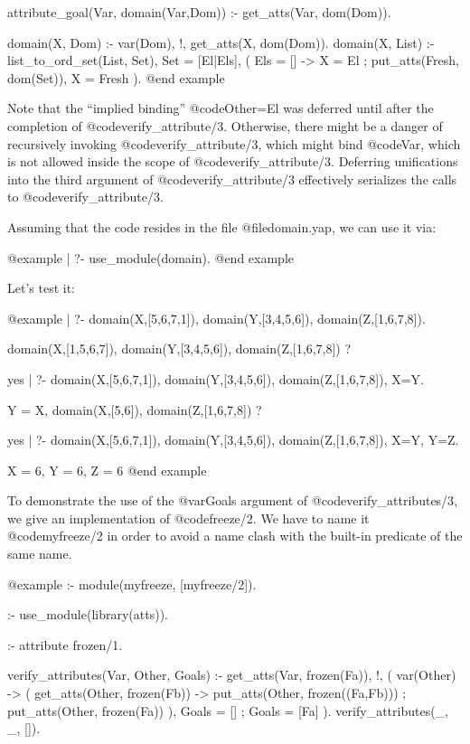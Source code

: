 attribute_goal(Var, domain(Var,Dom)) :-     %
        get_atts(Var, dom(Dom)).

domain(X, Dom) :-
        var(Dom), !,
        get_atts(X, dom(Dom)).
domain(X, List) :-
        list_to_ord_set(List, Set),
        Set = [El|Els],                     %
        (   Els = [] ->                     %
            X = El                          %
        ;   put_atts(Fresh, dom(Set)),
            X = Fresh                       %
        ).
@end example

Note that the ``implied binding'' @code{Other=El} was deferred until after
the completion of @code{verify_attribute/3}.  Otherwise, there might be a
danger of recursively invoking @code{verify_attribute/3}, which might bind
@code{Var}, which is not allowed inside the scope of @code{verify_attribute/3}.
Deferring unifications into the third argument of @code{verify_attribute/3}
effectively serializes the calls to @code{verify_attribute/3}.

Assuming that the code resides in the file @file{domain.yap}, we
can use it via:

@example
| ?- use_module(domain).
@end example

Let's test it:

@example
| ?- domain(X,[5,6,7,1]), domain(Y,[3,4,5,6]), domain(Z,[1,6,7,8]).

domain(X,[1,5,6,7]),
domain(Y,[3,4,5,6]),
domain(Z,[1,6,7,8]) ? 

yes
| ?- domain(X,[5,6,7,1]), domain(Y,[3,4,5,6]), domain(Z,[1,6,7,8]), 
     X=Y.

Y = X,
domain(X,[5,6]),
domain(Z,[1,6,7,8]) ? 

yes
| ?- domain(X,[5,6,7,1]), domain(Y,[3,4,5,6]), domain(Z,[1,6,7,8]),
     X=Y, Y=Z.

X = 6,
Y = 6,
Z = 6
@end example

To demonstrate the use of the @var{Goals} argument of
@code{verify_attributes/3}, we give an implementation of
@code{freeze/2}.  We have to name it @code{myfreeze/2} in order to
avoid a name clash with the built-in predicate of the same name.

@example
:- module(myfreeze, [myfreeze/2]).

:- use_module(library(atts)).

:- attribute frozen/1.

verify_attributes(Var, Other, Goals) :-
        get_atts(Var, frozen(Fa)), !,       %
        (   var(Other) ->                   %
            (   get_atts(Other, frozen(Fb)) %
            ->  put_atts(Other, frozen((Fa,Fb))) %
            ;   put_atts(Other, frozen(Fa)) %
            ),
            Goals = []
        ;   Goals = [Fa]
        ).
verify_attributes(_, _, []).

